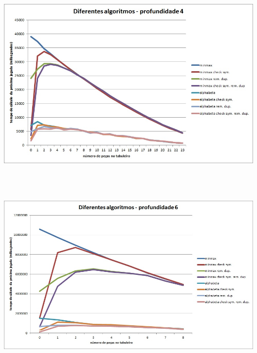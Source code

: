 \begin{table}[H]
\centering
\includegraphics[height=10cm]{performance/tempPerfComparisonDepth4.jpg}
\end{table}

\begin{table}[H]
\centering
\includegraphics[height=9.5cm]{performance/tempPerfComparisonDepth6.jpg}
\end{table}
